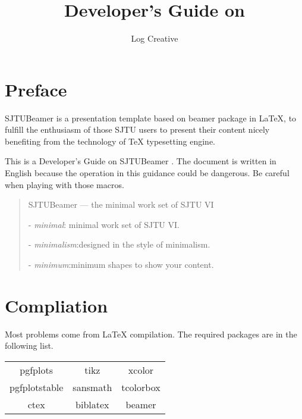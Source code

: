 \documentclass{article}
\title{Developer's Guide on\\ \tmin}
\author{Log Creative}
\def\tmin{\textsf{SJTUBeamer} \fbox{\textsc{min}}}
\begin{document}
    \maketitle
    \tableofcontents
    \section{Preface}

    \tmin{} is a presentation template based on \textsf{beamer} package in \LaTeX{}, to fulfill the enthusiasm of those SJTU users to present their content nicely benefiting from the technology of \TeX{} typesetting engine.
    
    This is a Developer's Guide on \tmin{} . The document is written in English because the operation in this guidance could be dangerous. Be careful when playing with those macros.

    \begin{quotation}
        \begin{center}
            \tmin{} --- the minimal work set of SJTU VI
        \end{center}
        \vspace*{1em}

         - \emph{minimal}: \hfill minimal work set of SJTU VI.

         - \emph{minimalism}:\hfill  designed in the style of minimalism.

         - \emph{minimum}:\hfill  minimum shapes to show your content.
    \end{quotation}

    \section{Compliation}

    Most problems come from \LaTeX{} compilation. The required packages are in the following list.
    
    \begin{table}[h]
        \centering
        \begin{tabular}{>{\sffamily}c>{\sffamily}c>{\sffamily}c}
            \hline
            pgfplots & tikz & xcolor \\
            pgfplotstable & sansmath & tcolorbox \\
            ctex & biblatex & beamer \\
            \hline
        \end{tabular}
    \end{table}
\end{document}
